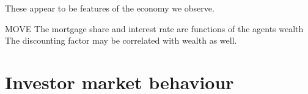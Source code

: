 These appear to be features of the economy we observe.

 MOVE The mortgage share and interest rate are functions of the agents wealth %
The discounting factor may be correlated with wealth as well. 

%
%


\section{Investor market behaviour}

